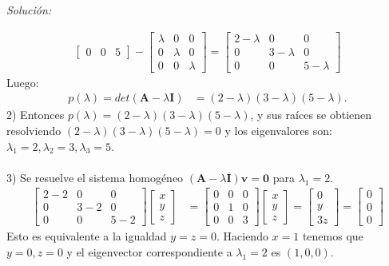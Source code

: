 \documentclass[12pt]{article}
\newenvironment{sol}
    {\emph{Solución:}
    }
    {
    }
\begin{document}
\begin{sol}
\begin{align*}
\begin{bmatrix}
0 & 0 & 5 
\end{bmatrix}
-
\begin{bmatrix}
\lambda & 0 & 0 \\
0 & \lambda & 0 \\
0 & 0 & \lambda
\end{bmatrix} 
=
\begin{bmatrix}
2-\lambda & 0 & 0\\
0 & 3-\lambda & 0 \\
0 & 0 & 5-\lambda
\end{bmatrix}
\end{align*}
Luego:
\begin{align*}
p(\lambda)=det(\mathbf{A}-\lambda\mathbf{I}) &= 
(2-\lambda) ( 3-\lambda) (5-\lambda).
\end{align*}
2) Entonces $p(\lambda)= (2-\lambda) ( 3-\lambda) (5-\lambda)$, y sus raíces se obtienen resolviendo $(2-\lambda) ( 3-\lambda) (5-\lambda) = 0$ y los eigenvalores son: $\lambda_1 = 2,\lambda_2=3,\lambda_3=5$.\\ \\
3) Se resuelve el sistema homogéneo $(\mathbf{A}-\lambda\mathbf{I})\mathbf{v}=\mathbf{0}$ para $\lambda_1=2$.
\begin{align*}
\begin{bmatrix}
2-2 & 0 & 0\\
0 & 3-2 & 0 \\
0 & 0 & 5-2
\end{bmatrix}
\begin{bmatrix}
x\\y\\z
\end{bmatrix}
&= 
\begin{bmatrix}
0 & 0 & 0\\
0 & 1 & 0 \\
0 & 0 & 3
\end{bmatrix}
\begin{bmatrix}
x\\y\\z
\end{bmatrix} =
\begin{bmatrix}
0\\y\\3z
\end{bmatrix}=
\begin{bmatrix}
0\\0\\0
\end{bmatrix}
\end{align*}
Esto es equivalente a la igualdad $y=z=0$. Haciendo $x=1$ tenemos que $y=0,z=0$ y el eigenvector correspondiente a $\lambda_1=2$ es $(1,0,0)$.\\\\

\end{sol}
\end{document}
